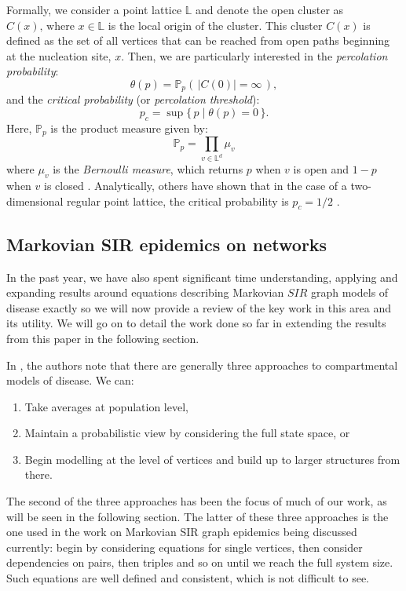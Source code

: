 \documentclass[../report.tex]{subfiles}
\begin{document}
Formally, we consider a point lattice $\mathbb{L}$ and denote the open cluster as $C(x)\text{,~where~}x\in\mathbb{L}$ is the local origin of the cluster. This cluster $C(x)$ is defined as the set of all vertices that can be reached from open paths beginning at the nucleation site, $x$. Then, we are particularly interested in the \emph{percolation probability}:
$$
\theta(p) = \mathbb{P}_p(\,|C(0)|=\infty\,),
$$
and the \emph{critical probability} (or \emph{percolation threshold}):
$$
p_c = \sup\{\,p \mid \theta(p)=0\,\}.
$$
Here, $\mathbb{P}_p$ is the product measure given by:
$$
\displaystyle \mathbb{P}_p=\prod_{v\in\mathbb{L}^d}\mu_v
$$
where $\mu_v$ is the \emph{Bernoulli measure}, which returns $p$ when $v$ is open and $1-p$ when $v$ is closed \cite[p. 28]{klenke_2014}. Analytically, others have shown that in the case of a two-dimensional regular point lattice, the critical probability is $p_c=1/2$ \cite{kersten_1980}.


\subsection{Markovian SIR epidemics on networks}

In the past year, we have also spent significant time understanding, applying and expanding results around equations describing Markovian $SIR$ graph models of disease exactly \cite{kiss_2014} so we will now provide a review of the key work in this area and its utility. We will go on to detail the work done so far in extending the results from this paper in the following section.

In \cite{kiss_2014}, the authors note that there are generally three approaches to compartmental models of disease. We can:
\begin{enumerate}
	\item Take averages at population level, 
	\item Maintain a probabilistic view by considering the full state space, or
	\item Begin modelling at the level of vertices and build up to larger structures from there.
\end{enumerate}

The second of the three approaches has been the focus of much of our work, as will be seen in the following section. The latter of these three approaches is the one used in the work on Markovian SIR graph epidemics being discussed currently: begin by considering equations for single vertices, then consider dependencies on pairs, then triples and so on until we reach the full system size. Such equations are well defined and consistent, which is not difficult to see.
\end{document}
